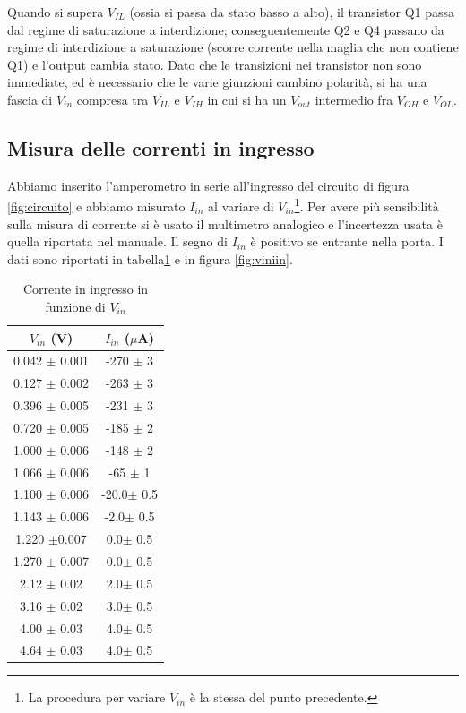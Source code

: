 \documentclass[10pt,a4paper]{article}
\begin{document}
Quando si supera $V_{IL}$ (ossia si passa da stato basso a alto), il transistor Q1 passa dal regime di saturazione a interdizione; conseguentemente Q2 e Q4 passano da regime di interdizione a saturazione (scorre corrente nella maglia che non contiene Q1) e l'output cambia stato. Dato che le transizioni nei transistor non sono immediate, ed è necessario che le varie giunzioni cambino polarità, si ha una fascia di $V_{in}$ compresa tra $V_{IL}$ e $V_{IH}$ in cui si ha un $V_{out}$ intermedio fra $V_{OH}$ e $V_{OL}$.
 
\subsection{Misura delle correnti in ingresso}
Abbiamo inserito l'amperometro in serie all'ingresso del circuito di figura \ref{fig:circuito} e abbiamo misurato $I_{in}$ al variare di $V_{in}$\footnote{La procedura per variare $V_{in}$ è la stessa del punto precedente.}. Per avere più sensibilità sulla misura di corrente si è usato il multimetro analogico e l'incertezza usata è quella riportata nel manuale. Il segno di $I_{in}$ è positivo se entrante nella porta.
I dati sono riportati in tabella\ref{tab:viniin} e in figura \ref{fig:viniin}.
\begin{table}[!htb]
\centering
\begin{tabular}{|c|c|}
\hline
$V_{in}$ (V) & $I_{in}$ ($\mu$A)\\
\hline
0.042 $\pm$ 0.001 & -270 $\pm$ 3\\
0.127 $\pm$ 0.002 & -263 $\pm$ 3\\
0.396 $\pm$ 0.005 & -231 $\pm$ 3\\
0.720 $\pm$ 0.005 & -185 $\pm$ 2\\
1.000 $\pm$ 0.006 & -148 $\pm$ 2\\
1.066 $\pm$ 0.006 & -65 $\pm$ 1\\
1.100 $\pm$ 0.006 & -20.0$\pm$ 0.5 \\
1.143 $\pm$ 0.006 & -2.0$\pm$ 0.5\\
1.220 $\pm$0.007 & 0.0$\pm$ 0.5\\
1.270 $\pm$ 0.007 & 0.0$\pm$ 0.5\\
2.12 $\pm$ 0.02 & 2.0$\pm$ 0.5\\
3.16 $\pm$ 0.02 & 3.0$\pm$ 0.5\\
4.00 $\pm$ 0.03 & 4.0$\pm$ 0.5\\
4.64 $\pm$ 0.03 & 4.0$\pm$ 0.5\\
\hline
\end{tabular}
\caption{Corrente in ingresso in funzione di $V_{in}$\label{tab:viniin}}
\end{table}
\end{document}

